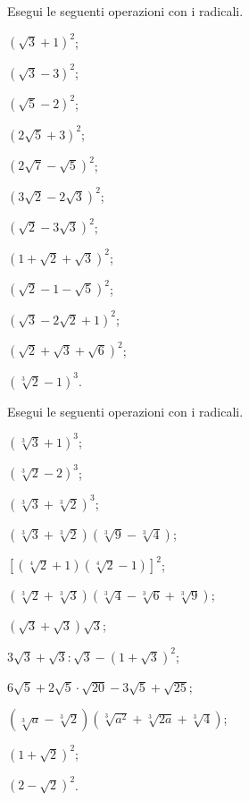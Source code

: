 \begin{esercizio}[\Ast]
 \label{ese:2.71}
Esegui le seguenti operazioni con i radicali.
 \begin{multicols}{3}
 \begin{enumeratea}
 \item $(\sqrt 3+1)^2$;
 \item $(\sqrt 3-3)^2$;
 \item $(\sqrt 5-2)^2$;
 \item $(2\sqrt 5+3)^2$;
 \item $(2\sqrt 7-\sqrt 5)^2$;
 \item $(3\sqrt 2-2\sqrt 3)^2$;
 \item $(\sqrt 2-3\sqrt 3)^2$;
 \item $(1+\sqrt 2+\sqrt 3)^2$;
 \item $(\sqrt 2-1-\sqrt 5)^2$;
 \item $(\sqrt 3-2\sqrt 2+1)^2$;
 \item $(\sqrt 2+\sqrt 3+\sqrt 6)^2$;
 \item $(\sqrt[3]2-1)^3$.
 \end{enumeratea}
 \end{multicols}
\end{esercizio}


\begin{esercizio}[\Ast]
 \label{ese:2.72}
Esegui le seguenti operazioni con i radicali.
 \begin{multicols}{2}
 \begin{enumeratea}
 \item $(\sqrt[3]3+1)^3$;
 \item $(\sqrt[3]2-2)^3$;
 \item $(\sqrt[3]3+\sqrt[3]2)^3$;
 \item $(\sqrt[3]3+\sqrt[3]2)(\sqrt[3]9-\sqrt[3]4)$;
 \item $\left[(\sqrt[4]2+1)(\sqrt[4]2-1)\right]^2$;
 \item $(\sqrt[3]2+\sqrt[3]3)(\sqrt[3]4-\sqrt[3]6+\sqrt[3]9)$;
 \item $(\sqrt 3+\sqrt 3)\sqrt 3$;
 \item $3\sqrt 3+\sqrt 3:\sqrt 3-(1+\sqrt 3)^2$;
 \item $6\sqrt 5+2\sqrt 5\cdot \sqrt{20}-3\sqrt 5+\sqrt{25}$;
 \item $(\sqrt[3]a-\sqrt[3]2)(\sqrt[3]{a^2}+\sqrt[3]{2a}+\sqrt[3]4)$;
 \item $(1+\sqrt 2)^2$;
 \item $(2-\sqrt 2)^2$.
 \end{enumeratea}
 \end{multicols}
\end{esercizio}

